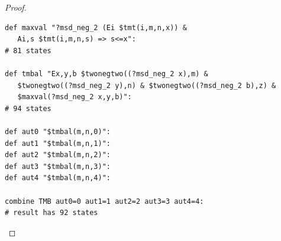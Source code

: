 \documentclass[10pt,a4paper]{amsart}
\begin{document}
\begin{proof}
\begin{verbatim}
def maxval "?msd_neg_2 (Ei $tmt(i,m,n,x)) & 
   Ai,s $tmt(i,m,n,s) => s<=x":
# 81 states

def tmbal "Ex,y,b $twonegtwo((?msd_neg_2 x),m) & 
   $twonegtwo((?msd_neg_2 y),n) & $twonegtwo((?msd_neg_2 b),z) &
   $maxval(?msd_neg_2 x,y,b)":
# 94 states

def aut0 "$tmbal(m,n,0)":
def aut1 "$tmbal(m,n,1)":
def aut2 "$tmbal(m,n,2)": 
def aut3 "$tmbal(m,n,3)":
def aut4 "$tmbal(m,n,4)":

combine TMB aut0=0 aut1=1 aut2=2 aut3=3 aut4=4:
# result has 92 states 
\end{verbatim}\vspace{-\baselineskip}
\end{proof}
\end{document}
